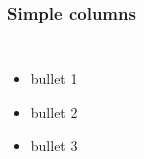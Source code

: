 \documentclass[t,english]{beamer}
\begin{document}
\begin{frame}[fragile]
\frametitle{Simple columns}

\begin{columns}[T]

\noindent{}

\begin{itemize}[<+-| alert@+>]

\item bullet 1

\item bullet 2

\item bullet 3
\end{itemize}

\end{columns}
\end{frame}
\end{document}
